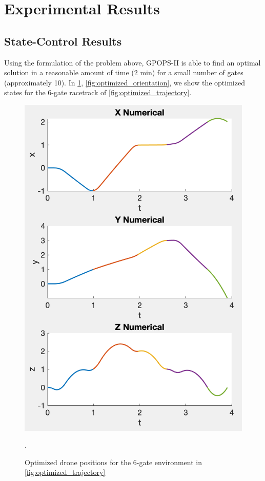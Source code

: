 
\section{Experimental Results}
\label{sec:results}

\subsection{State-Control Results}
Using the formulation of the problem above, \textrm{GPOPS-II} is able to find an optimal solution in a reasonable amount of time (2 min) for a small number of gates (approximately 10).
In \cref{fig:optimized_position}, \cref{fig:optimized_orientation}, we show the optimized states for the 6-gate racetrack of \cref{fig:optimized_trajectory}.

\begin{figure}[htbp]
  \centering
  \includegraphics[width=1.0\columnwidth]{img/position.png}
  \caption{Optimized drone positions for the 6-gate environment in \cref{fig:optimized_trajectory}}.
  \label{fig:optimized_position}
\end{figure}

